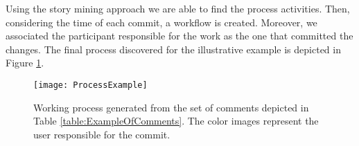 Using the story mining approach we are able to find the process activities. Then, considering the time of each commit, a workflow is created. Moreover, we associated the participant responsible for the work as the one that committed the changes. The final process discovered for the illustrative example is depicted in Figure \ref{fig:ExampleOfWorkingProcess}.

\begin{figure}[!h]
	\centering
  \texttt{[image: ProcessExample]}
  \caption{Working process generated from the set of comments depicted in Table
  \label{fig:ExampleOfWorkingProcess} \ref{table:ExampleOfComments}. The color images represent the user responsible for the commit.}
\end{figure}


